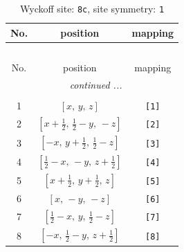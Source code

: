 \documentclass[fleqn,8pt]{jsarticle}
\begin{document}
\renewcommand{\arraystretch}{1.2}
\begin{longtable}{ccc}
\caption{Wyckoff site: {\tt 8c}, site symmetry: {\tt 1}}
 \\
 \hline \hline
No. & position & mapping \\ \hline \endfirsthead

\multicolumn{2}{l}{\tablename\ \thetable{}} \\
 \hline \hline
No. & position & mapping \\ \hline \endhead

 \hline \hline
\multicolumn{2}{r}{\footnotesize\it continued ...} \\ \endfoot

 \hline \hline
\multicolumn{2}{r}{} \\ \endlastfoot

1 & $\left[ x,\, y,\, z \right]$ & {\tt [1]} \\ \hline
2 & $\left[ x + \frac{1}{2},\, \frac{1}{2} - y,\, - z \right]$ & {\tt [2]} \\ \hline
3 & $\left[ - x,\, y + \frac{1}{2},\, \frac{1}{2} - z \right]$ & {\tt [3]} \\ \hline
4 & $\left[ \frac{1}{2} - x,\, - y,\, z + \frac{1}{2} \right]$ & {\tt [4]} \\ \hline
5 & $\left[ x + \frac{1}{2},\, y + \frac{1}{2},\, z \right]$ & {\tt [5]} \\ \hline
6 & $\left[ x,\, - y,\, - z \right]$ & {\tt [6]} \\ \hline
7 & $\left[ \frac{1}{2} - x,\, y,\, \frac{1}{2} - z \right]$ & {\tt [7]} \\ \hline
8 & $\left[ - x,\, \frac{1}{2} - y,\, z + \frac{1}{2} \right]$ & {\tt [8]} \\
\end{longtable}
\end{document}
